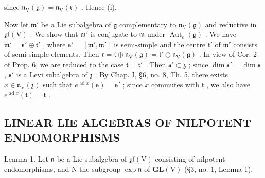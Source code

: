 since \(\mathfrak{n}_{\mathrm{V}}(\mathfrak{g}) = \mathfrak{n}_{\mathrm{V}}(\mathfrak{r})\) . Hence (i).

Now let \(\mathfrak{m}'\) be a Lie subalgebra of \(\mathfrak{g}\) complementary to \(\mathfrak{n}_{\mathrm{V}}(\mathfrak{g})\) and reductive in \(\mathfrak{gl}(\mathrm{V})\) . We show that \(\mathfrak{m}'\) is conjugate to \(\mathfrak{m}\) under \(\operatorname{Aut}_e(\mathfrak{g})\) . We have \(\mathfrak{m}' = \mathfrak{s}' \oplus \mathfrak{t}'\) , where \(\mathfrak{s}' = [\mathfrak{m}', \mathfrak{m}']\) is semi-simple and the centre \(\mathfrak{t}'\) of \(\mathfrak{m}'\) consists of semi-simple elements. Then \(\mathfrak{r} = \mathfrak{t} \oplus \mathfrak{n}_{\mathrm{V}}(\mathfrak{g}) = \mathfrak{t}' \oplus \mathfrak{n}_{\mathrm{V}}(\mathfrak{g})\) . In view of Cor. 2 of Prop. 6, we are reduced to the case \(\mathfrak{t} = \mathfrak{t}'\) . Then \(\mathfrak{s}' \subset \mathfrak{z}\) ; since \(\dim \mathfrak{s}' = \dim \mathfrak{s}\) , \(\mathfrak{s}'\) is a Levi subalgebra of \(\mathfrak{z}\) . By Chap. I, §6, no. 8, Th. 5, there exists \(x \in \mathfrak{n}_{\mathrm{V}}(\mathfrak{z})\) such that \(e^{\operatorname{ad} x}(\mathfrak{s}) = \mathfrak{s}'\) ; since \(x\) commutes with \(\mathfrak{t}\) , we also have \(e^{\operatorname{ad} x}(\mathfrak{t}) = \mathfrak{t}\) .

\subsection{LINEAR LIE ALGEBRAS OF NILPOTENT ENDOMORPHISMS}

Lemma 1. Let \(\mathfrak{n}\) be a Lie subalgebra of \(\mathfrak{gl}(\mathrm{V})\) consisting of nilpotent endomorphisms, and \(\mathrm{N}\) the subgroup \(\exp \mathfrak{n}\) of \(\mathbf{GL}(\mathrm{V})\) (§3, no. 1, Lemma 1).

